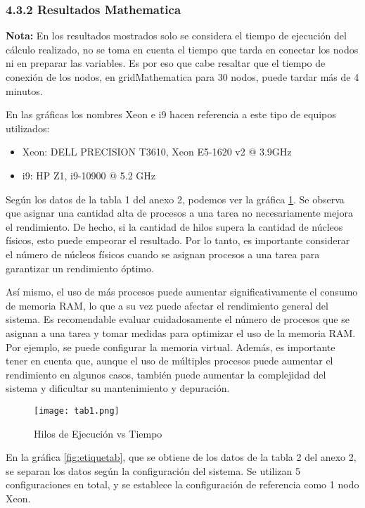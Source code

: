 \begin{spacing}{1.5}
      \subsubsection{4.3.2 Resultados Mathematica}

      \textbf{Nota:} En los resultados mostrados solo se considera el tiempo de ejecución del cálculo realizado, no se toma en cuenta el tiempo que tarda en conectar los nodos ni en preparar las variables. Es por eso que cabe resaltar que el tiempo de conexión de los nodos, en gridMathematica para 30 nodos, puede tardar más de 4 minutos.

      En las gráficas los nombres Xeon e i9 hacen referencia a este tipo de equipos utilizados: 

      \begin{itemize}
            \item Xeon: DELL PRECISION T3610, Xeon E5-1620 v2 @ 3.9GHz 
            \item i9: HP Z1, i9-10900 @ 5.2 GHz
      \end{itemize}

      Según los datos de la tabla 1 del anexo 2, podemos ver la gráfica \ref{fig:etiquetaa}. Se observa que asignar una cantidad alta de procesos a una tarea no necesariamente mejora el rendimiento. De hecho, si la cantidad de hilos supera la cantidad de núcleos físicos, esto puede empeorar el resultado. Por lo tanto, es importante considerar el número de núcleos físicos cuando se asignan procesos a una tarea para garantizar un rendimiento óptimo.

      Así mismo, el uso de más procesos puede aumentar significativamente el consumo de memoria RAM, lo que a su vez puede afectar el rendimiento general del sistema. Es recomendable evaluar cuidadosamente el número de procesos que se asignan a una tarea y tomar medidas para optimizar el uso de la memoria RAM. Por ejemplo, se puede configurar la memoria virtual. Además, es importante tener en cuenta que, aunque el uso de múltiples procesos puede aumentar el rendimiento en algunos casos, también puede aumentar la complejidad del sistema y dificultar su mantenimiento y depuración.\newpage

      \begin{figure}[h]
            \centering
            \texttt{[image: tab1.png]}
            \caption{Hilos de Ejecución vs Tiempo}
            \label{fig:etiquetaa}
          \end{figure}

          En la gráfica \ref{fig:etiquetab}, que se obtiene de los datos de la tabla 2 del anexo 2, se separan los datos según la configuración del sistema. Se utilizan 5 configuraciones en total, y se establece la configuración de referencia como 1 nodo Xeon.


\end{spacing}
